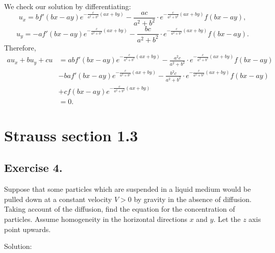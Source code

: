 \documentclass{article}
\begin{document}
		We check our solution by differentiating:
				\[u_x= b f'(bx-ay)e^{-\frac{c}{a^2+b^2}(ax+by)} -\frac{ac}{a^2+b^2} \cdot e^{-\frac{c}{a^2+b^2}(ax+by)}f(bx-ay),\]
				\[u_y= -a f'(bx-ay)e^{-\frac{c}{a^2+b^2}(ax+by)} -\frac{bc}{a^2+b^2} \cdot e^{-\frac{c}{a^2+b^2}(ax+by)}f(bx-ay).\]	
		Therefore,
		\begin{equation*}
			\begin{aligned}
				au_x+bu_y+cu&= 
				ab f'(bx-ay)e^{-\frac{c}{a^2+b^2}(ax+by)} -\frac{a^2c}{a^2+b^2} \cdot e^{-\frac{c}{a^2+b^2}(ax+by)}f(bx-ay)\\
				&-b a f'(bx-ay)e^{-\frac{c}{a^2+b^2}(ax+by)}-\frac{b^2c}{a^2+b^2} \cdot e^{-\frac{c}{a^2+b^2}(ax+by)}f(bx-ay) \\
				& +cf(bx-ay)e^{-\frac{c}{a^2+b^2}(ax+by)} \\
				&=0.
			\end{aligned}
		\end{equation*}

\section{Strauss section 1.3}
\subsection{Exercise 4.}
		Suppose that some particles which are
			suspended in a liquid medium would be pulled down
			at a constant velocity $V > 0$ by gravity in the
			absence of diffusion. Taking account of the
			diffusion, find the equation for the concentration
			of particles. Assume homogeneity in the horizontal
			directions $x$ and $y$. Let the $z$ axis point upwards.

			Solution:

\end{document}
